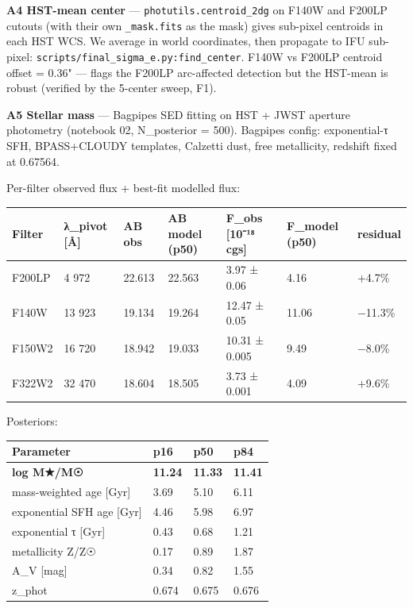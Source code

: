 \documentclass[
  10pt,
]{article}
\begin{document}
\textbf{A4 HST-mean center} --- \texttt{photutils.centroid\_2dg} on F140W and F200LP cutouts (with their own \texttt{\_mask.fits} as the mask) gives sub-pixel centroids in each HST WCS. We average in
world coordinates, then propagate to IFU sub-pixel: \texttt{scripts/final\_sigma\_e.py:find\_center}. F140W vs F200LP centroid offset = 0.36" --- flags the F200LP arc-affected detection but the
HST-mean is robust (verified by the 5-center sweep, F1).

\textbf{A5 Stellar mass} --- Bagpipes SED fitting on HST + JWST aperture photometry (notebook 02, N\_posterior = 500). Bagpipes config: exponential-τ SFH, BPASS+CLOUDY templates, Calzetti dust, free
metallicity, redshift fixed at 0.67564.

Per-filter observed flux + best-fit modelled flux:

\begingroup\small\setlength{\tabcolsep}{4pt}\begin{longtable}[]{@{}lllllll@{}}
\toprule
Filter & λ\_pivot {[}Å{]} & AB obs & AB model (p50) & F\_obs {[}10⁻¹⁸ cgs{]} & F\_model (p50) & residual \\
\midrule
\endhead
F200LP & 4 972 & 22.613 & 22.563 & 3.97 ± 0.06 & 4.16 & +4.7\% \\
F140W & 13 923 & 19.134 & 19.264 & 12.47 ± 0.05 & 11.06 & −11.3\% \\
F150W2 & 16 720 & 18.942 & 19.033 & 10.31 ± 0.005 & 9.49 & −8.0\% \\
F322W2 & 32 470 & 18.604 & 18.505 & 3.73 ± 0.001 & 4.09 & +9.6\% \\
\bottomrule
\end{longtable}\endgroup

Posteriors:

\begingroup\small\setlength{\tabcolsep}{4pt}\begin{longtable}[]{@{}llll@{}}
\toprule
Parameter & p16 & p50 & p84 \\
\midrule
\endhead
\textbf{log M★/M☉} & \textbf{11.24} & \textbf{11.33} & \textbf{11.41} \\
mass-weighted age {[}Gyr{]} & 3.69 & 5.10 & 6.11 \\
exponential SFH age {[}Gyr{]} & 4.46 & 5.98 & 6.97 \\
exponential τ {[}Gyr{]} & 0.43 & 0.68 & 1.21 \\
metallicity Z/Z☉ & 0.17 & 0.89 & 1.87 \\
A\_V {[}mag{]} & 0.34 & 0.82 & 1.55 \\
z\_phot & 0.674 & 0.675 & 0.676 \\
\bottomrule
\end{longtable}\endgroup
\end{document}

